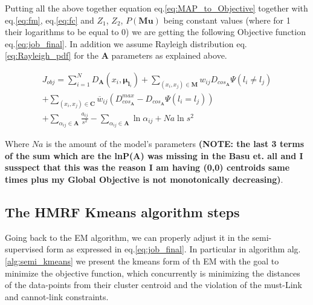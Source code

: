 \documentclass[dvips,dvipdfm,pdftex]{llncs}
\begin{document}
Putting all the above together equation eq.\ref{eq:MAP_to_Objective} together with eq.\ref{eq:fm}, eq.\ref{eq:fc} and $Z_{1}$, $Z_{2}$, $P(\mathbf{Mu})$ being constant values (where for 1 their logarithms to be equal to 0) we are getting the following Objective function eq.\ref{eq:job_final}. In addition we assume Rayleigh distribution eq.\ref{eq:Rayleigh_pdf} for the $\mathbf{A}$ parameters as explained above.

\begin{equation}
	\begin{split}
		J_{obj}=\sum_{i=1}^{N}D_{\mathbf{A}}(x_{i},\mathbf{\mu}_{\mathbf{l}_{i}})
		+\sum_{(x_{i},x_{j})\in\mathbf{M}}w_{ij}D_{cos_{\mathbf{A}}}\Psi(l_{i}\neq l_{j}) \\
		+\sum_{(x_{i},x_{j})\in\mathbf{C}}\overline{w}_{ij}(D_{cos_{\mathbf{A}}}^{max}-D_{cos_{\mathbf{A}}}\Psi(l_{i}=l_{j})) \\
		+\sum_{\alpha_{ij}\in\mathbf{A}}\frac{a_{ij}}{s^{2}}-\sum_{\alpha_{ij}\in\mathbf{A}}\ln\alpha_{ij}+ \mathit{Na} \ln s^{2}
	\end{split}
\label{eq:job_final}
\end{equation}

Where $\mathit{Na}$ is the amount of the model's parameters \textbf{(NOTE: the last 3 terms of the sum which are the lnP(A) was missing in the Basu et. all and I susspect that this was the reason I am having (0,0) centroids same times plus my Global Objective is not monotonically decreasing)}.

\subsection{The HMRF Kmeans algorithm steps}

Going back to the EM algorithm, we can properly adjust it in the semi-supervised form as expressed in eq.\ref{eq:job_final}. In particular in algorithm alg.\ref{alg:semi_kmeans} we present the kmeans form of th EM with the goal to minimize the objective function, which concurrently is minimizing the distances of the data-points from their cluster centroid and the violation of the must-Link and cannot-link constraints.
\end{document}
